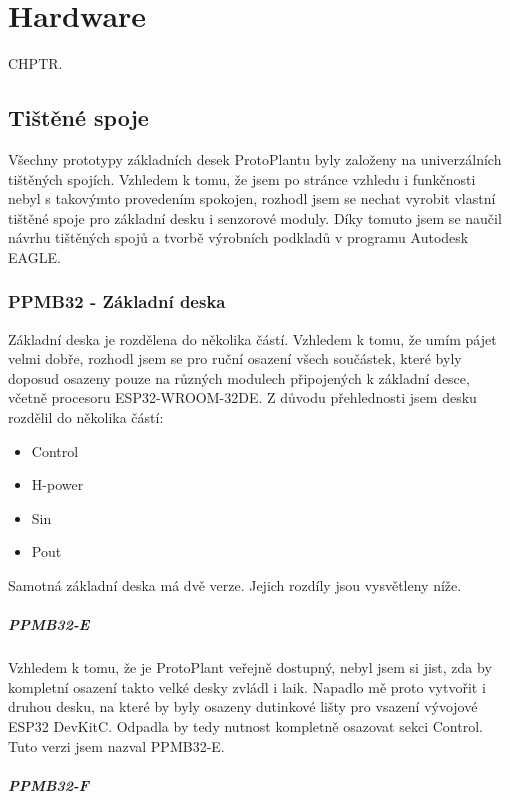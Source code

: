 \chapter{Hardware}
CHPTR.

\section{Tištěné spoje}
Všechny prototypy základních desek ProtoPlantu byly založeny na univerzálních tištěných spojích. Vzhledem k tomu, že jsem po stránce vzhledu i funkčnosti nebyl s takovýmto provedením spokojen, rozhodl jsem se nechat vyrobit vlastní tištěné spoje pro základní desku i senzorové moduly.
Díky tomuto jsem se naučil návrhu tištěných spojů a tvorbě výrobních podkladů v programu Autodesk EAGLE.

\subsection*{PPMB32 - Základní deska}
Základní deska je rozdělena do několika částí. 
Vzhledem k tomu, že umím pájet velmi dobře, rozhodl jsem se pro ruční osazení všech součástek, které byly doposud osazeny pouze na různých modulech připojených k základní desce, včetně procesoru ESP32-WROOM-32DE.
Z důvodu přehlednosti jsem desku rozdělil do několika částí:

\begin{itemize}
    \item Control 
    \item H-power 
    \item Sin 
    \item Pout 
\end{itemize} 


Samotná základní deska má dvě verze. Jejich rozdíly jsou vysvětleny níže.

\paragraph*{PPMB32-E}
Vzhledem k tomu, že je ProtoPlant veřejně dostupný, nebyl jsem si jist, zda by kompletní osazení takto velké desky zvládl i laik. 
Napadlo mě proto vytvořit i druhou desku, na které by byly osazeny dutinkové lišty pro vsazení vývojové ESP32 DevKitC. 
Odpadla by tedy nutnost kompletně osazovat sekci Control. Tuto verzi jsem nazval PPMB32-E.

\paragraph*{PPMB32-F}

